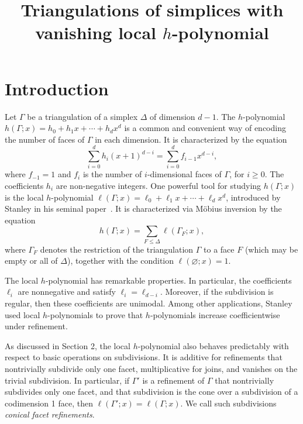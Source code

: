 \documentclass[ALCO,ThmDefs,Unicode,epreuves]{cedram}
\author{\firstname{Andr{\'e}}  \lastname{de Moura}}
\author{\firstname{Elijah} \lastname{Gunther}}
\author{\firstname{Sam} \lastname{Payne}}
\author{\firstname{Jason} \lastname{Schuchardt}}
\author{\firstname{Alan} \lastname{Stapledon}}
\title{Triangulations of simplices with vanishing local $h$-polynomial}
\begin{document}
\maketitle

\section{Introduction}

Let $\Gamma$ be a triangulation of a simplex $\Delta$ of dimension $d-1$. 
The $h$-polynomial $h(\Gamma; x) = h_0 + h_1 x + \cdots + h_d x^d$ is a common and
convenient way of encoding the number of faces of $\Gamma$ in each dimension. 
It is characterized by the equation
\[
\sum_{i=0}^{d} h_i (x+1)^{d-i} = \sum_{i=0}^d f_{i-1} x^{d-i},
\]
where $f_{-1} = 1$ and $f_i$ is the number of $i$-dimensional faces of $\Gamma$,
for $i \geq 0$. The coefficients $h_i$ are non-negative integers. 
One powerful tool for studying $h(\Gamma;x)$ is the local $h$-polynomial
$\ell(\Gamma;x) = \ell_0 + \ell_1x + \cdots + \ell_d x^d$,
introduced by Stanley in his seminal paper~\cite{Stanley92}. 
It is characterized via M{\"o}bius inversion by the equation
\begin{equation} \label{eq:h=sum-of-l}
h(\Gamma;x) = \sum_{F \leq \Delta} \ell(\Gamma_F;x),
\end{equation}
where $\Gamma_F$ denotes the restriction of the triangulation $\Gamma$ to a face $F$
(which may be empty or all of $\Delta$), together with the condition $\ell(\varnothing; x) = 1$.

The local $h$-polynomial has remarkable properties. 
In particular, the coefficients $\ell_i$ are nonnegative and satisfy $ \ell_i = \ell_{d-i}$.
Moreover, if the subdivision is regular, then these coefficients are unimodal. 
Among other applications, Stanley used local $h$-polynomials to prove that $h$-polynomials
increase coefficientwise under refinement.

As discussed in Section 2, the local $h$-polynomial also behaves predictably with respect 
to basic operations on subdivisions. It is additive for refinements that nontrivially 
subdivide only one facet, multiplicative for joins, and vanishes on the trivial subdivision. 
In particular, if $\Gamma'$ is a refinement of $\Gamma$ that nontrivially subdivides only
one facet, and that subdivision is the cone over a subdivision of a codimension 1 face, 
then $\ell(\Gamma';x) = \ell(\Gamma;x)$. We call such subdivisions 
\emph{conical facet refinements}. 
\end{document}
